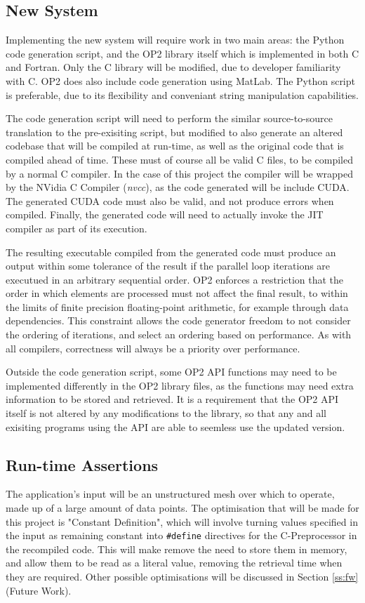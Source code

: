 \subsection{New System}
Implementing the new system will require work in two main areas: the Python code generation script, and the OP2 library itself which is implemented in both C and Fortran. Only the C library will be modified, due to developer familiarity with C. OP2 does also include code generation using MatLab. The Python script is preferable, due to its flexibility and conveniant string manipulation capabilities.
\par
The code generation script will need to perform the similar source-to-source translation to the pre-exisiting script, but modified to also generate an altered codebase that will be compiled at run-time, as well as the original code that is compiled ahead of time. These must of course all be valid C files, to be compiled by a normal C compiler. In the case of this project the compiler will be wrapped by the NVidia C Compiler (\textit{nvcc}), as the code generated will be include CUDA. The generated CUDA code must also be valid, and not produce errors when compiled. Finally, the generated code will need to actually invoke the JIT compiler as part of its execution.
\par
The resulting executable compiled from the generated code must produce an output within some tolerance of the result if the parallel loop iterations are executued in an arbitrary sequential order. OP2 enforces a restriction that the order in which elements are processed must not affect the final result, to within the limits of finite precision floating-point arithmetic\cite[p3]{op2main}, for example through data dependencies. This constraint allows the code generator freedom to not consider the ordering of iterations, and select an ordering based on performance. As with all compilers, correctness will always be a priority over performance.
\par
Outside the code generation script, some OP2 API functions may need to be implemented differently in the OP2 library files, as the functions may need extra information to be stored and retrieved. It is a requirement that the OP2 API itself is not altered by any modifications to the library, so that any and all exisiting programs using the API are able to seemless use the updated version.

\subsection{Run-time Assertions}
The application's input will be an unstructured mesh over which to operate, made up of a large amount of data points. The optimisation that will be made for this project is "Constant Definition", which will involve turning values specified in the input as remaining constant into \verb|#define| directives for the C-Preprocessor in the recompiled code. This will make remove the need to store them in memory, and allow them to be read as a literal value, removing the retrieval time when they are required. Other possible optimisations will be discussed in Section \ref{ss:fw} (Future Work).

